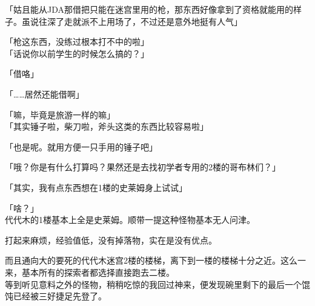 「姑且能从JDA那借把只能在迷宫里用的枪，那东西好像拿到了资格就能用的样子。虽说往深了走就派不上用场了，不过还是意外地挺有人气」

「枪这东西，没练过根本打不中的啦」\\

「话说你以前学生的时候怎么搞的？」

「借咯」

「……居然还能借啊」

「嘛，毕竟是旅游一样的嘛」\\

「其实锤子啦，柴刀啦，斧头这类的东西比较容易啦」

「也是呢。就用方便一只手用的锤子吧」

「哦？你是有什么打算吗？果然还是去找初学者专用的2楼的哥布林们？」

「其实，我有点东西想在1楼的史莱姆身上试试」

「啥？」\\

代代木的1楼基本上全是史莱姆。顺带一提这种怪物基本无人问津。

打起来麻烦，经验值低，没有掉落物，实在是没有优点。

而且通向大的要死的代代木迷宫2楼的楼梯，离下到一楼的楼梯十分之近。这么一来，基本所有的探索者都选择直接跑去二楼。\\

等到听见意料之外的怪物，稍稍吃惊的我回过神来，便发现碗里剩下的最后一个馄饨已经被三好捷足先登了。\\

